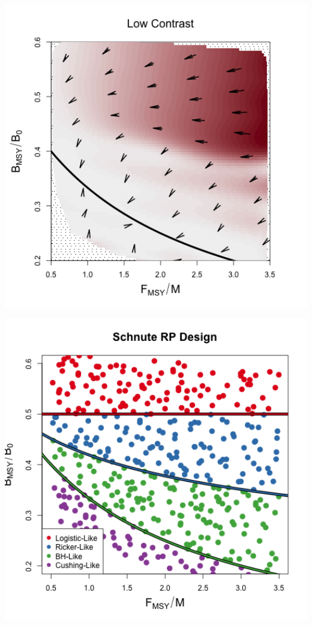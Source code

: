 \documentclass[ xcolor = pdftex, dvipsnames, table ]{beamer}
\begin{document}
%
\begin{frame}
\begin{minipage}[h!]{0.49\textwidth}
        \includegraphics[width=1\textwidth]{../../gpBias/directionalBiasSchnuteSubHHardFlatT30N150WWideN112.png}
\end{minipage}
\begin{minipage}[h!]{0.49\textwidth}
        \includegraphics[width=1\textwidth]{../../ddBias/designLineColorHHardFlatT30N150WWideN112.png}
\end{minipage}
\end{frame}
\end{document}
